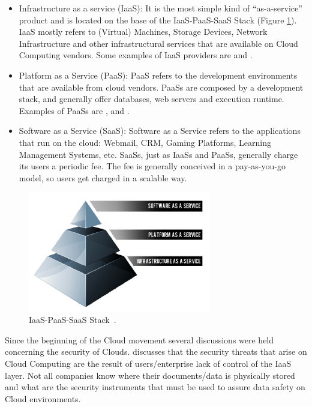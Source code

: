 \begin{itemize}
   \item{Infrastructure as a service (IaaS): It is the most simple kind of ``as-a-service'' product and is located on the base of the IaaS-PaaS-SaaS Stack (Figure \ref{fig:cloudstach}). IaaS mostly refers to (Virtual) Machines, Storage Devices, Network Infrastructure and other infrastructural services that are available on Cloud Computing vendors.} Some examples of IaaS providers are \cite{amazonec2} \cite{rackspace} and \cite{azure}. 
   \item{Platform as a Service (PaaS): PaaS refers to the development environments that are available from cloud vendors. PaaSs are composed by a development stack, and generally offer databases, web servers and execution runtime. Examples of PaaSs are \cite{beanstalk}, \cite{azure} and \cite{GAE}.  }
   \item{Software as a Service (SaaS): Software as a Service refers to the applications that run on the cloud: Webmail, CRM, Gaming Platforms, Learning Management Systems, etc. SaaSs, just as IaaSs and PaaSs, generally charge its users a periodic fee. The fee is generally conceived in a pay-as-you-go model, so users get charged in a scalable way.  
}

\end{itemize}



\begin{figure}[ht!]
\centering
\includegraphics[width=80mm]{cloud_stack.png}
\caption{IaaS-PaaS-SaaS Stack~\cite{kepes2011understanding}.\label{fig:cloudstach}}
\end{figure}

Since the beginning of the Cloud movement several discussions were held concerning the security of Clouds. \cite{2010security} discusses that the security threats that arise on Cloud Computing are the result of users/enterprise lack of control of the IaaS layer. Not all companies know where their documents/data is physically stored and what are the security instruments that must be used to assure data safety on Cloud environments.

